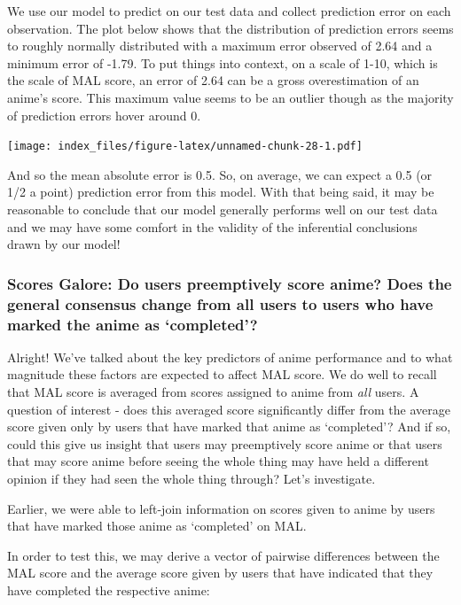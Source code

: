 \documentclass[
]{article}
\begin{document}
We use our model to predict on our test data and collect prediction
error on each observation. The plot below shows that the distribution of
prediction errors seems to roughly normally distributed with a maximum
error observed of 2.64 and a minimum error of -1.79. To put things into
context, on a scale of 1-10, which is the scale of MAL score, an error
of 2.64 can be a gross overestimation of an anime's score. This maximum
value seems to be an outlier though as the majority of prediction errors
hover around 0.

\texttt{[image: index\_files/figure-latex/unnamed-chunk-28-1.pdf]}

And so the mean absolute error is 0.5. So, on average, we can expect a
0.5 (or 1/2 a point) prediction error from this model. With that being
said, it may be reasonable to conclude that our model generally performs
well on our test data and we may have some comfort in the validity of
the inferential conclusions drawn by our model!

\hypertarget{scores-galore-do-users-preemptively-score-anime-does-the-general-consensus-change-from-all-users-to-users-who-have-marked-the-anime-as-completed}{%
\subsubsection{Scores Galore: Do users preemptively score anime? Does
the general consensus change from all users to users who have marked the
anime as
`completed'?}\label{scores-galore-do-users-preemptively-score-anime-does-the-general-consensus-change-from-all-users-to-users-who-have-marked-the-anime-as-completed}}

Alright! We've talked about the key predictors of anime performance and
to what magnitude these factors are expected to affect MAL score. We do
well to recall that MAL score is averaged from scores assigned to anime
from \emph{all} users. A question of interest - does this averaged score
significantly differ from the average score given only by users that
have marked that anime as `completed'? And if so, could this give us
insight that users may preemptively score anime or that users that may
score anime before seeing the whole thing may have held a different
opinion if they had seen the whole thing through? Let's investigate.

Earlier, we were able to left-join information on scores given to anime
by users that have marked those anime as `completed' on MAL.

In order to test this, we may derive a vector of pairwise differences
between the MAL score and the average score given by users that have
indicated that they have completed the respective anime:
\end{document}
